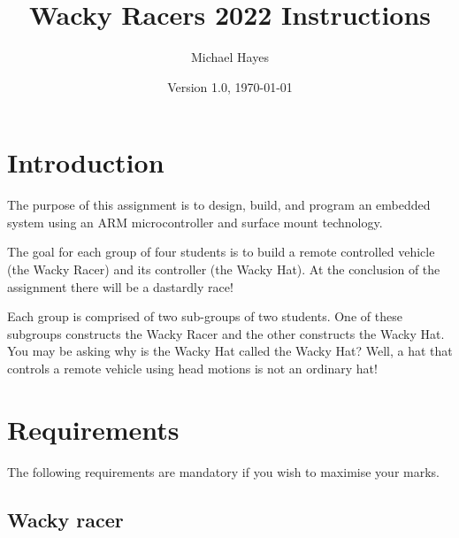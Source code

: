 \documentclass[11pt, a4paper]{article}
\title{Wacky Racers 2022 Instructions}
\author{Michael Hayes}
\date{Version 1.0, \today}
\begin{document}
\maketitle

\section{Introduction}

The purpose of this assignment is to design, build, and program an
embedded system using an ARM microcontroller and surface mount
technology.

The goal for each group of four students is to build a remote
controlled vehicle (the Wacky Racer) and its controller (the Wacky
Hat).  At the conclusion of the assignment there will be a dastardly race!

Each group is comprised of two sub-groups of two students.  One of
these subgroups constructs the Wacky Racer and the other constructs
the Wacky Hat.  You may be asking why is the Wacky Hat called the
Wacky Hat?  Well, a hat that controls a remote vehicle using head
motions is not an ordinary hat!


\section{Requirements}

The following requirements are mandatory if you wish to maximise your
marks.


\subsection{Wacky racer}
\end{document}
